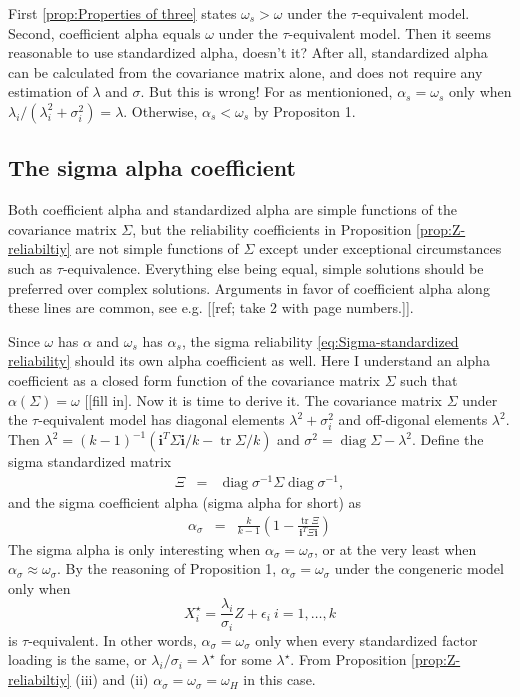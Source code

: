 \documentclass{article}
\theoremstyle{plain}
\theoremstyle{plain}
\theoremstyle{definition}
\theoremstyle{remark}
\theoremstyle{definition}
\theoremstyle{plain}
\theoremstyle{plain}
\theoremstyle{definition}
\DeclareMathOperator{\tr}{tr}
\DeclareMathOperator{\diag}{diag}
\begin{document}
First \ref{prop:Properties of three} states $\omega_{s}>\omega$
under the $\tau$-equivalent model. Second, coefficient alpha equals
$\omega$ under the $\tau$-equivalent model. Then it seems reasonable
to use standardized alpha, doesn't it? After all, standardized alpha
can be calculated from the covariance matrix alone, and does not require
any estimation of $\lambda$ and $\sigma$. But this is wrong! For
as mentionioned, $\alpha_{s}=\omega_{s}$ only when $\lambda_{i}/(\lambda_{i}^{2}+\sigma_{i}^{2})=\lambda$.
Otherwise, $\alpha_{s}<\omega_{s}$ by Propositon 1.

\subsection{The sigma alpha coefficient}
Both coefficient alpha and standardized alpha are simple functions
of the covariance matrix $\Sigma$, but the reliability coefficients
in Proposition \ref{prop:Z-reliabiltiy} are not simple functions
of $\Sigma$ except under exceptional circumstances such as $\tau$-equivalence.
Everything else being equal, simple solutions should be preferred
over complex solutions. Arguments in favor of coefficient alpha along
these lines are common, see e.g. {[}{[}ref; take 2 with page numbers.{]}{]}.

Since $\omega$ has $\alpha$ and $\omega_{s}$ has $\alpha_{s}$,
the sigma reliability \eqref{eq:Sigma-standardized reliability} should
its own alpha coefficient as well. Here I understand an alpha coefficient
as a closed form function of the covariance matrix $\Sigma$ such
that $\alpha\left(\Sigma\right)=\omega$ {[}{[}fill in{]}. Now it
is time to derive it. The covariance matrix $\Sigma$ under the $\tau$-equivalent
model has diagonal elements $\lambda^{2}+\sigma_{i}^{2}$ and off-digonal
elements $\lambda^{2}$. Then $\lambda^{2}=\left(k-1\right)^{-1}\left(\mathbf{i}^{T}\Sigma\mathbf{i}/k-\tr\Sigma/k\right)$
and $\sigma^{2}=\diag\Sigma-\lambda^{2}$. Define the sigma standardized
matrix
\begin{eqnarray*}
\Xi & = & \diag\sigma^{-1}\Sigma\diag\sigma^{-1},
\end{eqnarray*}
and the sigma coefficient alpha (sigma alpha for short) as
\begin{eqnarray}
\alpha_{\sigma} & = & \frac{k}{k-1}\left(1-\frac{\tr\Xi}{\mathbf{i}^{T}\Xi\mathbf{i}}\right)\label{eq:alpha_sigma-1}
\end{eqnarray}
The sigma alpha is only interesting when $\alpha_{\sigma}=\omega_{\sigma}$,
or at the very least when $\alpha_{\sigma}\approx\omega_{\sigma}$.
By the reasoning of Proposition 1, $\alpha_{\sigma}=\omega_{\sigma}$
under the congeneric model only when 
\begin{equation}
X_{i}^{\star}=\frac{\lambda_{i}}{\sigma_{i}}Z+\epsilon_{i}\:i=1,\ldots,k\label{eq:sigma model}
\end{equation}
is $\tau$-equivalent. In other words, $\alpha_{\sigma}=\omega_{\sigma}$
only when every standardized factor loading is the same, or $\lambda_{i}/\sigma_{i}=\lambda^{\star}$
for some $\lambda^{\star}$. From Proposition \ref{prop:Z-reliabiltiy}
(iii) and (ii) $\alpha_{\sigma}=\omega_{\sigma}=\omega_{H}$ in this
case.
\end{document}
